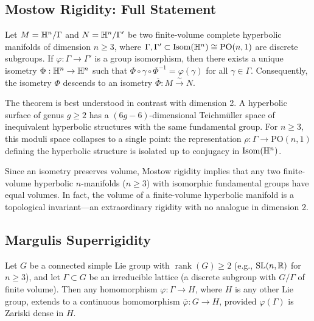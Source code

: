 \subsection{Mostow Rigidity: Full Statement}

\begin{theorem}
Let $M = \mathbb{H}^n / \Gamma$ and $N = \mathbb{H}^n / \Gamma'$ be two finite-volume complete hyperbolic manifolds of dimension $n \geq 3$, where $\Gamma, \Gamma' \subset \operatorname{Isom}(\mathbb{H}^n) \cong \mathrm{PO}(n,1)$ are discrete subgroups. If $\varphi: \Gamma \to \Gamma'$ is a group isomorphism, then there exists a unique isometry $\Phi: \mathbb{H}^n \to \mathbb{H}^n$ such that $\Phi \circ \gamma \circ \Phi^{-1} = \varphi(\gamma)$ for all $\gamma \in \Gamma$. Consequently, the isometry $\Phi$ descends to an isometry $\overline{\Phi}: M \xrightarrow{\sim} N$.
\end{theorem}

\begin{remark}
The theorem is best understood in contrast with dimension 2. A hyperbolic surface of genus $g \geq 2$ has a $(6g-6)$-dimensional Teichm\"uller space of inequivalent hyperbolic structures with the same fundamental group. For $n \geq 3$, this moduli space collapses to a single point: the representation $\rho: \Gamma \to \mathrm{PO}(n,1)$ defining the hyperbolic structure is isolated up to conjugacy in $\operatorname{Isom}(\mathbb{H}^n)$.
\end{remark}

\begin{remark}
Since an isometry preserves volume, Mostow rigidity implies that any two finite-volume hyperbolic $n$-manifolds ($n \geq 3$) with isomorphic fundamental groups have equal volumes. In fact, the volume of a finite-volume hyperbolic manifold is a topological invariant---an extraordinary rigidity with no analogue in dimension 2.
\end{remark}

\subsection{Margulis Superrigidity}

\begin{theorem}
Let $G$ be a connected simple Lie group with $\operatorname{rank}(G) \geq 2$ (e.g., $\operatorname{SL}(n,\mathbb{R})$ for $n \geq 3$), and let $\Gamma \subset G$ be an irreducible lattice (a discrete subgroup with $G/\Gamma$ of finite volume). Then any homomorphism $\varphi: \Gamma \to H$, where $H$ is any other Lie group, extends to a continuous homomorphism $\overline{\varphi}: G \to H$, provided $\varphi(\Gamma)$ is Zariski dense in $H$.
\end{theorem}

